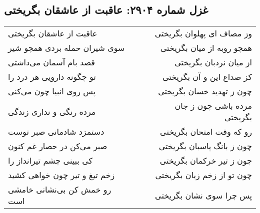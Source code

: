 \begin{center}
\section*{غزل شماره ۲۹۰۴: عاقبت از عاشقان بگریختی}
\label{sec:2904}
\begin{longtable}{l p{0.5cm} r}
عاقبت از عاشقان بگریختی
&&
وز مصاف ای پهلوان بگریختی
\\
سوی شیران حمله بردی همچو شیر
&&
همچو روبه از میان بگریختی
\\
قصد بام آسمان می‌داشتی
&&
از میان نردبان بگریختی
\\
تو چگونه دارویی هر درد را
&&
کز صداع این و آن بگریختی
\\
پس روی انبیا چون می‌کنی
&&
چون ز تهدید خسان بگریختی
\\
مرده رنگی و نداری زندگی
&&
مرده باشی چون ز جان بگریختی
\\
دستمزد شادمانی صبر توست
&&
رو که وقت امتحان بگریختی
\\
صبر می‌کن در حصار غم کنون
&&
چون ز بانگ پاسبان بگریختی
\\
کی ببینی چشم تیرانداز را
&&
چون ز تیر خرکمان بگریختی
\\
زخم تیغ و تیر چون خواهی کشید
&&
چون تو از زخم زبان بگریختی
\\
رو خمش کن بی‌نشانی خامشی است
&&
پس چرا سوی نشان بگریختی
\\
\end{longtable}
\end{center}
